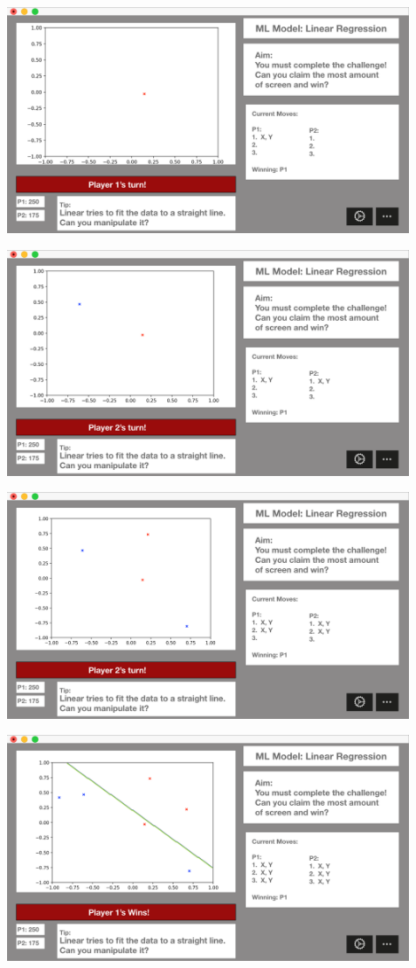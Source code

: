 \documentclass[a4paper,10pt]{article}
\begin{document}
\begin{center}
	\item\includegraphics[width=12cm]{Web19201.png}
	\item\includegraphics[width=12cm]{Web19202.png}
	\item\includegraphics[width=12cm]{Web19203.png}
	\item\includegraphics[width=12cm]{Web19204.png}
\end{center}
\end{document}
